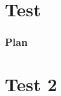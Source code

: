 \documentclass[aspectratio=169, usepdftitle=false, xcolor={dvipsnames}, 9pt,table]{beamer}
\begin{document}

\section{Test}

\begin{frame}[t]
    \frametitle{Plan}
    \tableofcontents[currentsection]
\end{frame}

\section{Test 2}
\end{document}
